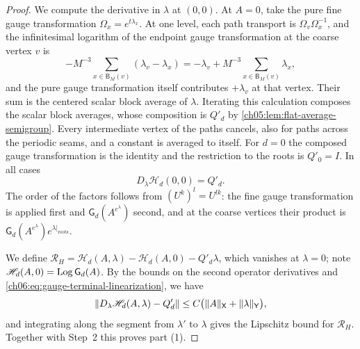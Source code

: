 \begin{proof}
We compute the derivative in $\lambda$ at $(0,0)$. At $A=0$, take the pure fine gauge transformation $\Omega_x=e^{t\lambda_x}$. At one level, each path transport is $\Omega_v\Omega_x^{-1}$, and the infinitesimal logarithm of the endpoint gauge transformation at the coarse vertex $v$ is
\[
 -M^{-3}\sum_{x\in\mathsf B_M(v)}(\lambda_v-\lambda_x)=-\lambda_v+M^{-3}\sum_{x\in\mathsf B_M(v)}\lambda_x,
\]
and the pure gauge transformation itself contributes $+\lambda_v$ at that vertex. Their sum is the centered scalar block average of $\lambda$. Iterating this calculation composes the scalar block averages, whose composition is $Q'_d$ by \cref{ch05:lem:flat-average-semigroup}. Every intermediate vertex of the paths cancels, also for paths across the periodic seams, and a constant is averaged to itself. For $d=0$ the composed gauge transformation is the identity and the restriction to the roots is $Q'_0=I$. In all cases
\begin{equation}\label{ch06:eq:gauge-terminal-linearization}
 D_\lambda\mathscr H_d(0,0)=Q'_d.
\end{equation}
The order of the factors follows from $(U^k)^l=U^{lk}$: the fine gauge transformation is applied first and $\mathsf G_d(A^{e^\lambda})$ second, and at the coarse vertices their product is $\mathsf G_d(A^{e^\lambda})e^{\lambda|_{\mathrm{roots}}}$.

We define $\mathscr R_H=\mathscr H_d(A,\lambda)-\mathscr H_d(A,0)-Q'_d\lambda$, which vanishes at $\lambda=0$; note $\mathscr H_d(A,0)=\operatorname{Log}\mathsf G_d(A)$. By the bounds on the second operator derivatives and \eqref{ch06:eq:gauge-terminal-linearization}, we have
\[
 \lVert D_\lambda\mathscr H_d(A,\lambda)-Q'_d\rVert\le C\bigl(\lVert A\rVert_{\mathsf X}+\lVert \lambda\rVert_{\mathsf Y}\bigr),
\]
and integrating along the segment from $\lambda'$ to $\lambda$ gives the Lipschitz bound for $\mathscr R_H$. Together with Step~2 this proves part (1).


\end{proof}
